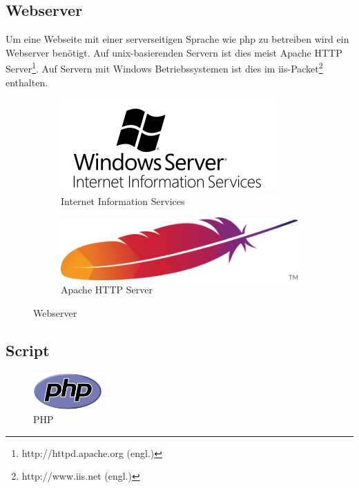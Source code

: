 \documentclass[a4paper,11pt,twoside,titlepage,openright]{report}
\numberwithin{equation}{section}		%
\numberwithin{figure}{section}			%
\numberwithin{table}{section}				%
\begin{document}
\subsection{Webserver}

Um eine Webseite mit einer serverseitigen Sprache wie \acrshort{php} zu betreiben wird ein Webserver benötigt. Auf \gls{unix}-basierenden Servern ist dies meist Apache HTTP Server\footnote{http://httpd.apache.org (engl.)}. Auf Servern mit Windows Betriebssystemen ist dies im \acrshort{iis}-Packet\footnote{http://www.iis.net (engl.)} enthalten.

\begin{figure}[H]
	\centering
	\begin{subfigure}[b]{0.4\textwidth}
		\includegraphics[width=\textwidth]{Images/iis.png}
		\caption{Internet Information Services}
	\end{subfigure}
	\begin{subfigure}[b]{0.4\textwidth}
		\includegraphics[width=\textwidth]{Images/Apache_HTTP_Server.png}
		\caption{Apache HTTP Server}
	\end{subfigure}
    \caption{Webserver}
\end{figure}

\subsection{Script}

\begin{figure}
\centering
\includegraphics[width=100px]{Images/php.png}
\caption{PHP}
\end{figure}
\end{document}
